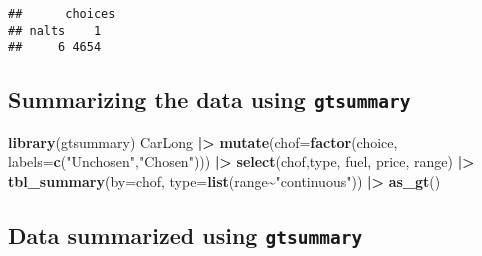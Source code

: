 \documentclass[
  11pt,
]{article}
\newenvironment{Shaded}{\begin{snugshade}}{\end{snugshade}}
\newcommand{\AttributeTok}[1]{\textcolor[rgb]{0.13,0.29,0.53}{#1}}
\newcommand{\FunctionTok}[1]{\textcolor[rgb]{0.13,0.29,0.53}{\textbf{#1}}}
\newcommand{\NormalTok}[1]{#1}
\newcommand{\SpecialCharTok}[1]{\textcolor[rgb]{0.81,0.36,0.00}{\textbf{#1}}}
\newcommand{\StringTok}[1]{\textcolor[rgb]{0.31,0.60,0.02}{#1}}
\begin{document}
\begin{verbatim}
##      choices
## nalts    1
##     6 4654
\end{verbatim}

\hypertarget{summarizing-the-data-using-gtsummary}{%
\subsection{\texorpdfstring{Summarizing the data using
\texttt{gtsummary}}{Summarizing the data using gtsummary}}\label{summarizing-the-data-using-gtsummary}}

\small

\begin{Shaded}
\begin{Highlighting}[]
\FunctionTok{library}\NormalTok{(gtsummary)}
\NormalTok{CarLong }\SpecialCharTok{|\textgreater{}} 
  \FunctionTok{mutate}\NormalTok{(}\AttributeTok{chof=}\FunctionTok{factor}\NormalTok{(choice,}
                     \AttributeTok{labels=}\FunctionTok{c}\NormalTok{(}\StringTok{"Unchosen"}\NormalTok{,}\StringTok{"Chosen"}\NormalTok{))) }\SpecialCharTok{|\textgreater{}} 
  \FunctionTok{select}\NormalTok{(chof,type, fuel, price, range) }\SpecialCharTok{|\textgreater{}} 
  \FunctionTok{tbl\_summary}\NormalTok{(}\AttributeTok{by=}\NormalTok{chof, }\AttributeTok{type=}\FunctionTok{list}\NormalTok{(range}\SpecialCharTok{\textasciitilde{}}\StringTok{"continuous"}\NormalTok{)) }\SpecialCharTok{|\textgreater{}}
  \FunctionTok{as\_gt}\NormalTok{()}
\end{Highlighting}
\end{Shaded}

\normalsize

\hypertarget{data-summarized-using-gtsummary}{%
\subsection{\texorpdfstring{Data summarized using
\texttt{gtsummary}}{Data summarized using gtsummary}}\label{data-summarized-using-gtsummary}}

\small
\end{document}
